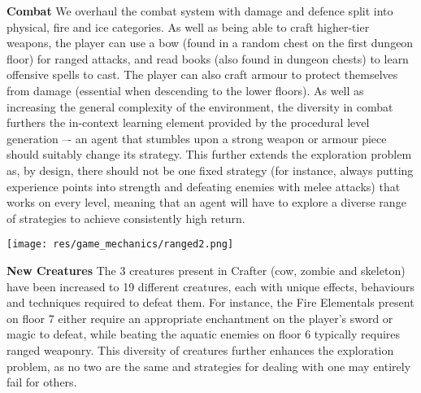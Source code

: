 \documentclass{article}
\theoremstyle{plain}
\theoremstyle{definition}
\theoremstyle{remark}
\begin{document}
\textbf{Combat} We overhaul the combat system with damage and defence split into physical, fire and ice categories.  As well as being able to craft higher-tier weapons, the player can use a bow (found in a random chest on the first dungeon floor) for ranged attacks, and read books (also found in dungeon chests) to learn offensive spells to cast.  The player can also craft armour to protect themselves from damage (essential when descending to the lower floors).  As well as increasing the general complexity of the environment, the diversity in combat furthers the in-context learning element provided by the procedural level generation –- an agent that stumbles upon a strong weapon or armour piece should suitably change its strategy. This further extends the exploration problem as, by design, there should not be one fixed strategy (for instance, always putting experience points into strength and defeating enemies with melee attacks) that works on every level, meaning that an agent will have to explore a diverse range of strategies to achieve consistently high return.



{\centering
\texttt{[image: res/game\_mechanics/ranged2.png]}
\par}

\textbf{New Creatures} The 3 creatures present in Crafter (cow, zombie and skeleton) have been increased to 19 different creatures, each with unique effects, behaviours and techniques required to defeat them.  For instance, the Fire Elementals present on floor 7 either require an appropriate enchantment on the player's sword or magic to defeat, while beating the aquatic enemies on floor 6 typically requires ranged weaponry. This diversity of creatures further enhances the exploration problem, as no two are the same and strategies for dealing with one may entirely fail for others.

\end{document}
